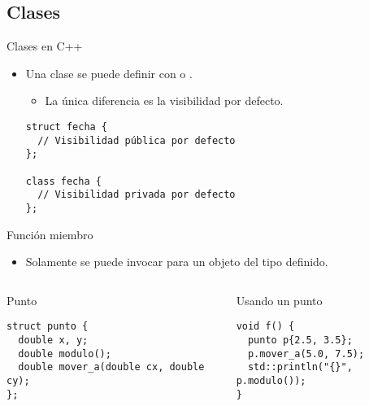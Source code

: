 \subsection{Clases}

\begin{frame}[t,fragile]{Clases en C++}
\begin{itemize}
  \item Una clase se puede definir con  o .
    \begin{itemize}
      \item La única diferencia es la visibilidad por defecto.
    \end{itemize}
\begin{lstlisting}
struct fecha {
  // Visibilidad pública por defecto
};

class fecha {
  // Visibilidad privada por defecto
};
\end{lstlisting}
\end{itemize}
\end{frame}

\begin{frame}[t,fragile]{Función miembro}
\begin{itemize}
  \item Solamente se puede invocar para un objeto del tipo definido.
\end{itemize}

\begin{columns}[T]

\begin{block}{Punto}
\begin{lstlisting}
struct punto {
  double x, y;
  double modulo();
  double mover_a(double cx, double cy);
};
\end{lstlisting}
\end{block}

\begin{block}{Usando un punto}
\begin{lstlisting}
void f() {
  punto p{2.5, 3.5};
  p.mover_a(5.0, 7.5);
  std::println("{}", p.modulo());
}
\end{lstlisting}
\end{block}
\end{columns}

\end{frame}

